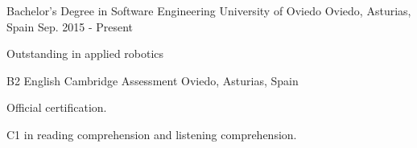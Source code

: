 

\begin{cventries}

  \cventry
  {Bachelor's Degree in Software Engineering} %
  {University of Oviedo} %
  {Oviedo, Asturias, Spain} %
  {Sep. 2015 - Present} %
  {
    \begin{cvitems} %
      \item {Outstanding in applied robotics}
    \end{cvitems}
  }


  \cventry
  {B2 English} %
  {Cambridge Assessment} %
  {Oviedo, Asturias, Spain} %
  {} %
  {
    \begin{cvitems} %
      \item {Official certification.}
      \item {C1 in reading comprehension and listening comprehension.}
    \end{cvitems}
  }

\end{cventries}